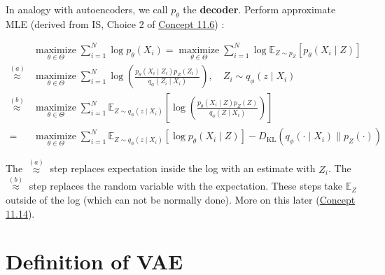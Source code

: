 \begin{concept}
    In analogy with autoencoders, we call $p_{\theta}$ the \textbf{decoder}.
    Perform approximate MLE (derived from IS, Choice 2 of \hyperref[concept:11.6]{Concept 11.6}) :

    $$
    \begin{aligned}
    & \underset{\theta \in \Theta}{\operatorname{maximize}} \sum_{i=1}^{N} \log p_{\theta}\left(X_{i}\right)=\underset{\theta \in \Theta}{\operatorname{maximize}} \sum_{i=1}^{N} \log \mathbb{E}_{Z \sim p_{Z}}\left[p_{\theta}\left(X_{i} \mid Z\right)\right] \\
    \stackrel{(a)}{\approx} & \underset{\theta \in \Theta}{\operatorname{maximize}} \sum_{i=1}^{N} \log \left(\frac{p_{\theta}\left(X_{i} \mid Z_{i}\right) p_{Z}\left(Z_{i}\right)}{q_{\phi}\left(Z_{i} \mid X_{i}\right)}\right), \quad Z_{i} \sim q_{\phi}\left(z \mid X_{i}\right) \\
    \stackrel{(b)}{\approx} & \underset{\theta \in \Theta}{\operatorname{maximize}} \sum_{i=1}^{N} \mathbb{E}_{Z \sim q_{\phi}\left(z \mid X_{i}\right)}\left[\log \left(\frac{p_{\theta}\left(X_{i} \mid Z\right) p_{Z}(Z)}{q_{\phi}\left(Z \mid X_{i}\right)}\right)\right] \\
    = & \underset{\theta \in \Theta}{\operatorname{maximize}} \sum_{i=1}^{N} \mathbb{E}_{Z \sim q_{\phi}\left(z \mid X_{i}\right)}\left[\log p_{\theta}\left(X_{i} \mid Z\right)\right]-D_{\mathrm{KL}}\left(q_{\phi}\left(\cdot \mid X_{i}\right) \| p_{Z}(\cdot)\right)
    \end{aligned}
    $$

    The $\stackrel{(a)}{\approx}$ step replaces expectation inside the log with an estimate with $Z_{i}$.
    The $\stackrel{(b)}{\approx}$ step replaces the random variable with the expectation.
    These steps take $\mathbb{E}_{Z}$ outside of the log (which can not be normally done).
    More on this later (\hyperref[concept:11.14]{Concept 11.14}).
\end{concept}

\section{Definition of VAE}

